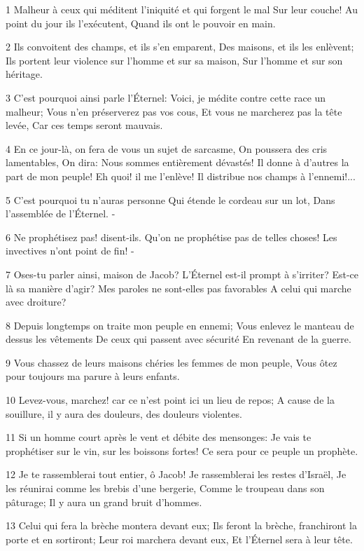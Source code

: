 \par 1 Malheur à ceux qui méditent l'iniquité et qui forgent le mal Sur leur couche! Au point du jour ils l'exécutent, Quand ils ont le pouvoir en main.
\par 2 Ils convoitent des champs, et ils s'en emparent, Des maisons, et ils les enlèvent; Ils portent leur violence sur l'homme et sur sa maison, Sur l'homme et sur son héritage.
\par 3 C'est pourquoi ainsi parle l'Éternel: Voici, je médite contre cette race un malheur; Vous n'en préserverez pas vos cous, Et vous ne marcherez pas la tête levée, Car ces temps seront mauvais.
\par 4 En ce jour-là, on fera de vous un sujet de sarcasme, On poussera des cris lamentables, On dira: Nous sommes entièrement dévastés! Il donne à d'autres la part de mon peuple! Eh quoi! il me l'enlève! Il distribue nos champs à l'ennemi!...
\par 5 C'est pourquoi tu n'auras personne Qui étende le cordeau sur un lot, Dans l'assemblée de l'Éternel. -
\par 6 Ne prophétisez pas! disent-ils. Qu'on ne prophétise pas de telles choses! Les invectives n'ont point de fin! -
\par 7 Oses-tu parler ainsi, maison de Jacob? L'Éternel est-il prompt à s'irriter? Est-ce là sa manière d'agir? Mes paroles ne sont-elles pas favorables A celui qui marche avec droiture?
\par 8 Depuis longtemps on traite mon peuple en ennemi; Vous enlevez le manteau de dessus les vêtements De ceux qui passent avec sécurité En revenant de la guerre.
\par 9 Vous chassez de leurs maisons chéries les femmes de mon peuple, Vous ôtez pour toujours ma parure à leurs enfants.
\par 10 Levez-vous, marchez! car ce n'est point ici un lieu de repos; A cause de la souillure, il y aura des douleurs, des douleurs violentes.
\par 11 Si un homme court après le vent et débite des mensonges: Je vais te prophétiser sur le vin, sur les boissons fortes! Ce sera pour ce peuple un prophète.
\par 12 Je te rassemblerai tout entier, ô Jacob! Je rassemblerai les restes d'Israël, Je les réunirai comme les brebis d'une bergerie, Comme le troupeau dans son pâturage; Il y aura un grand bruit d'hommes.
\par 13 Celui qui fera la brèche montera devant eux; Ils feront la brèche, franchiront la porte et en sortiront; Leur roi marchera devant eux, Et l'Éternel sera à leur tête.


